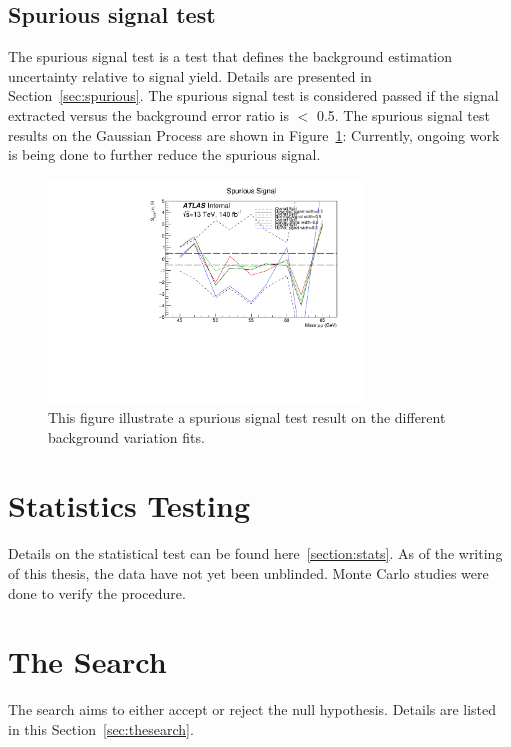 \subsection{Spurious signal test}

The spurious signal test is a test that defines the background estimation uncertainty relative to signal yield. Details are presented in Section~\ref{sec:spurious}.
The spurious signal test is considered passed if the signal extracted versus the background error ratio is $<$ 0.5.
The spurious signal test results on the Gaussian Process are shown in Figure~\ref{fig:spurious}:
Currently, ongoing work is being done to further reduce the spurious signal.

\begin{figure}[!htb]
    \begin{center}
        \includegraphics[width=0.75\textwidth]{figures/chapter_dimuon/spurious}        
        \caption{
        This figure illustrate a spurious signal test result on the different background variation fits.}
        \label{fig:spurious}
    \end{center}
\end{figure}
\FloatBarrier

\section{Statistics Testing}
Details on the statistical test can be found here~\ref{section:stats}. As of the writing of this thesis, the data have not yet been unblinded. Monte Carlo studies were done to verify the procedure. 

\section{The Search}
The search aims to either accept or reject the null hypothesis. Details are listed in this Section~\ref{sec:thesearch}.

